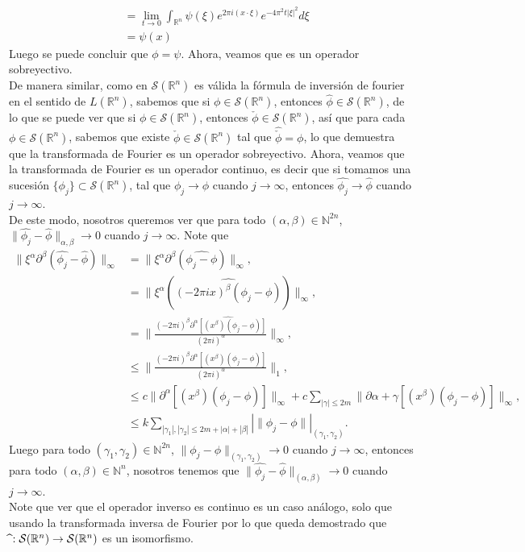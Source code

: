 \begin{homeworkProblem}
\begin{solution}
\begin{align*}
			  &=\lim_{t\rightarrow 0}\int_{\mathbb{R}^n}\hat{\psi}(\xi)e^{2\pi i (x\cdot \xi)}e^{-4\pi^2t|\xi|^2}d\xi\\
			  &=\psi(x)
		  \end{align*}
		  Luego se puede concluir que $\phi=\psi$.
		  Ahora, veamos que es un operador sobreyectivo.\\
      De manera similar, como en $\mathcal{S}(\mathbb{R}^{n})$ es válida la fórmula de inversión de fourier en el sentido de $L(\mathbb{R}^{n})$, sabemos que si $\phi\in\mathcal{S}(\mathbb{R}^n)$, entonces $\hat{\phi}\in\mathcal{S}(\mathbb{R}^n)$, de lo que se puede ver que si $\phi\in\mathcal{S}(\mathbb{R}^n)$, entonces $\check{\phi}\in\mathcal{S}(\mathbb{R}^n)$, así que para cada $\phi\in\mathcal{S}(\mathbb{R}^n)$, sabemos que existe $\check{\phi}\in\mathcal{S}(\mathbb{R}^n)$ tal que $\hat{\check{\phi}}=\phi$, lo que demuestra que la transformada de Fourier es un operador sobreyectivo.
		Ahora, veamos que la transformada de Fourier es un operador continuo, es decir que si tomamos una sucesión $\{\phi_j\}\subset \mathcal{S}(\mathbb{R}^n)$, tal que $\phi_j \rightarrow \phi$ cuando $j\rightarrow \infty$, entonces $\hat{\phi_j}\rightarrow \hat{\phi}$ cuando $j\rightarrow \infty$.\\
		  De este modo, nosotros queremos ver que para todo $(\alpha,\beta)\in\mathbb{N}^{2n}$, $\|\hat{\phi_j}-\hat{\phi}\|_{\alpha,\beta}\rightarrow 0$ cuando $j\rightarrow \infty$. Note que
      \begin{align*}
			  \|\xi^{\alpha}\partial^{\beta}(\hat{\phi_j}-\hat{\phi})\|_{\infty}&=\|\xi^{\alpha}\partial^{\beta}(\hat{\phi_j-\phi})\|_{\infty},\\
			  &=\|\xi^{\alpha}(\hat{(-2\pi ix)^{\beta}(\phi_j-\phi)})\|_{\infty},\\
			  &=\|\frac{(-2\pi i)^{\beta}\hat{\partial^{\alpha}[(x^\beta)(\phi_j-\phi)]}}{(2\pi i)^{\alpha}}\|_{\infty},\\
			  &\leq\|\frac{(-2\pi i)^{\beta}\partial^{\alpha}[(x^\beta)(\phi_j-\phi)]}{(2\pi i)^{\alpha}}\|_{1},\\
			  &\leq c\|\partial^{\alpha}[(x^\beta)(\phi_j-\phi)]\|_{\infty}+c\sum_{|\gamma|\leq 2m}\|\partial{\alpha+\gamma}[(x^\beta)(\phi_j-\phi)]\|_{\infty},\\
			  &\leq k \sum_{|\gamma_1|,|\gamma_2|\leq2m+|\alpha|+|\beta|}|\|\phi_j-\phi\||_{(\gamma_1,\gamma_2)}.
		  \end{align*}
		  Luego para todo $(\gamma_1,\gamma_2)\in\mathbb{N}^{2n}$, $\|\phi_j-\phi\|_{(\gamma_1,\gamma_2)}\rightarrow 0$ cuando $j\rightarrow \infty$, entonces para todo $(\alpha,\beta)\in\mathbb{N}^{n}$, nosotros tenemos que $\|\hat{\phi_j}-\hat{\phi}\|_{(\alpha,\beta)}\rightarrow 0$ cuando $j\rightarrow \infty$.\\
      Note que ver que el operador inverso es continuo es un caso análogo, solo que usando la transformada inversa de Fourier por lo que queda demostrado que \phantom{  }$\hat{\empty}:\mathcal{S}(\mathbb{R}^n)\rightarrow\mathcal{S}(\mathbb{R}^n)$ es un isomorfismo.
  \end{solution}
\end{homeworkProblem}
